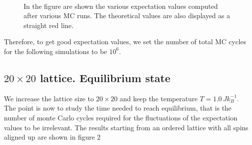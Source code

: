 \documentclass[%
 reprint,
 amsmath,amssymb,
 aps,
]{revtex4-1}
\theoremstyle{plain}
\theoremstyle{definition}
\theoremstyle{plain}
\begin{document}
\begin{figure}[ht]
	\label{2x2evalues}
	\centering
	\\
\caption{In the figure are shown the various expectation values computed after various MC runs. The theoretical values are also displayed as a straight red line.}
\end{figure}
	
Therefore, to get good expectation values, we set the number of total MC cycles for the following simulations to be $10^6$.



\subsection{$20 \times 20$ lattice. Equilibrium state}
We increase the lattice size to $20\times20$ and keep the temperature $T=1.0\,Jk_B^{-1}$. The point is now to study the time needed to reach equilibrium, that is the number of monte Carlo cycles required for the fluctuations of the expectation values to be irrelevant. The results starting from an ordered lattice with all spins aligned up are shown in figure 2
\end{document}
